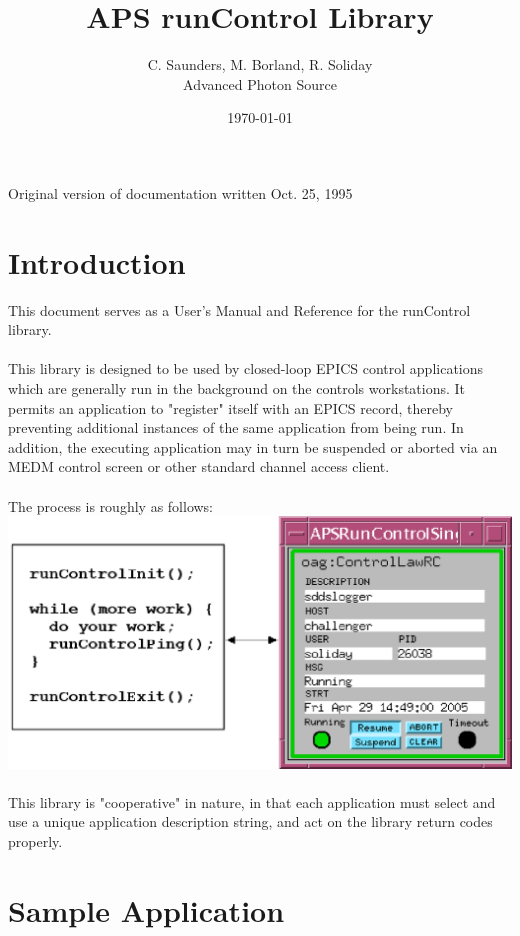 \documentclass[11pt]{article}
\begin{document}
\title{APS runControl Library}
\author{C. Saunders, M. Borland, R. Soliday\\Advanced Photon Source}
\date{\today}
\maketitle

\begin{center}
Original version of documentation written Oct. 25, 1995
\end{center}

\section{Introduction}

This document serves as a User's Manual and Reference for the runControl library.\\
\\
This library is designed to be used by closed-loop EPICS control applications which are generally run in the background on the controls workstations. It permits an application to "register" itself with an EPICS record, thereby preventing additional instances of the same application from being run. In addition, the executing application may in turn be suspended or aborted via an MEDM control screen or other standard channel access client.\\
\\
The process is roughly as follows:\\
\includegraphics{rc.eps}\\
\\
This library is "cooperative" in nature, in that each application must select and use a unique application description string, and act on the library return codes properly.

\section{Sample Application}
\end{document}
